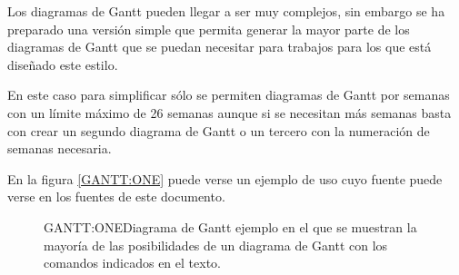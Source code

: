 Los diagramas de Gantt pueden llegar a ser muy complejos, sin embargo se ha preparado una versión simple que permita generar la mayor parte de los diagramas de Gantt que se puedan necesitar para trabajos para los que está diseñado este estilo.

En este caso para simplificar sólo se permiten diagramas de Gantt por semanas con un límite máximo de 26 semanas aunque si se necesitan más semanas basta con crear un segundo diagrama de Gantt o un tercero con la numeración de semanas necesaria.

En la figura \ref{GANTT:ONE} puede verse un ejemplo de uso cuyo fuente puede verse en los fuentes de este documento.

\begin{figure}[Ejemplo de diagrama de Gantt]{GANTT:ONE}{Diagrama de Gantt ejemplo en el que se muestran la mayoría de las posibilidades de un diagrama de Gantt con los comandos indicados en el texto.}
\begin{gantt}{1}{26}
   \\
   \\
   \\
   \\
   \\
   \\
  \\
   \\
   \\
   \\
   \\
   \\
   \\
   \\
   \\
   \\
   \\
   \\
\end{gantt}
\end{figure}

